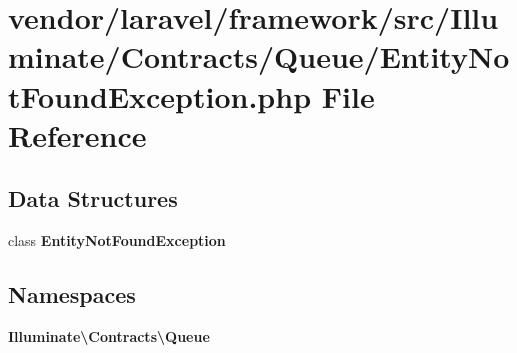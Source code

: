 \section{vendor/laravel/framework/src/\+Illuminate/\+Contracts/\+Queue/\+Entity\+Not\+Found\+Exception.php File Reference}
\label{_entity_not_found_exception_8php}
\subsection*{Data Structures}
\begin{DoxyCompactItemize}
\item 
class {\bf Entity\+Not\+Found\+Exception}
\end{DoxyCompactItemize}
\subsection*{Namespaces}
\begin{DoxyCompactItemize}
\item 
 {\bf Illuminate\textbackslash{}\+Contracts\textbackslash{}\+Queue}
\end{DoxyCompactItemize}
